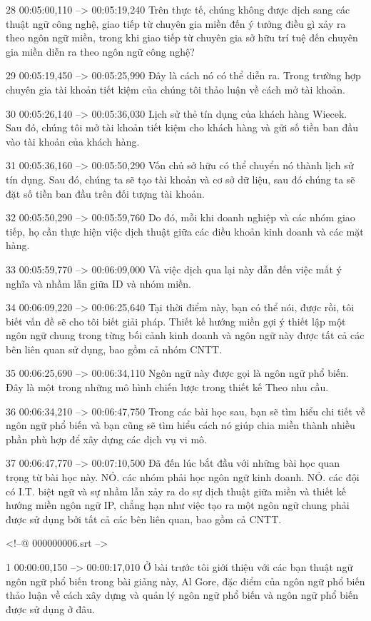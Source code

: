 28
00:05:00,110 --> 00:05:19,240
Trên thực tế, chúng không được dịch sang các thuật ngữ công nghệ, giao tiếp từ chuyên gia miền đến ý tưởng điều gì xảy ra theo ngôn ngữ miền, trong khi giao tiếp từ chuyên gia sở hữu trí tuệ đến chuyên gia miền diễn ra theo ngôn ngữ công nghệ?

29
00:05:19,450 --> 00:05:25,990
Đây là cách nó có thể diễn ra.  Trong trường hợp chuyên gia tài khoản tiết kiệm của chúng tôi thảo luận về cách mở tài khoản.

30
00:05:26,140 --> 00:05:36,030
Lịch sử thẻ tín dụng của khách hàng Wiecek.  Sau đó, chúng tôi mở tài khoản tiết kiệm cho khách hàng và gửi số tiền ban đầu vào tài khoản của khách hàng.

31
00:05:36,160 --> 00:05:50,290
Vốn chủ sở hữu có thể chuyển nó thành lịch sử tín dụng.  Sau đó, chúng ta sẽ tạo tài khoản và cơ sở dữ liệu, sau đó chúng ta sẽ đặt số tiền ban đầu trên đối tượng tài khoản.

32
00:05:50,290 --> 00:05:59,760
Do đó, mỗi khi doanh nghiệp và các nhóm giao tiếp, họ cần thực hiện việc dịch thuật giữa các điều khoản kinh doanh và các mặt hàng.

33
00:05:59,770 --> 00:06:09,000
Và việc dịch qua lại này dẫn đến việc mất ý nghĩa và nhầm lẫn giữa ID và nhóm miền.

34
00:06:09,220 --> 00:06:25,640
Tại thời điểm này, bạn có thể nói, được rồi, tôi biết vấn đề sẽ cho tôi biết giải pháp.  Thiết kế hướng miền gợi ý thiết lập một ngôn ngữ chung trong từng bối cảnh kinh doanh và ngôn ngữ này được tất cả các bên liên quan sử dụng, bao gồm cả nhóm CNTT.

35
00:06:25,690 --> 00:06:34,110
Ngôn ngữ này được gọi là ngôn ngữ phổ biến.  Đây là một trong những mô hình chiến lược trong thiết kế Theo nhu cầu.

36
00:06:34,210 --> 00:06:47,750
Trong các bài học sau, bạn sẽ tìm hiểu chi tiết về ngôn ngữ phổ biến và bạn cũng sẽ tìm hiểu cách nó giúp chia miền thành nhiều phần phù hợp để xây dựng các dịch vụ vi mô.

37
00:06:47,770 --> 00:07:10,500
Đã đến lúc bắt đầu với những bài học quan trọng từ bài học này.  NÓ.  các nhóm phải học ngôn ngữ kinh doanh.  NÓ.  các đội có I.T.  biệt ngữ và sự nhầm lẫn xảy ra do sự dịch thuật giữa miền và thiết kế hướng miền ngôn ngữ IP, chẳng hạn như việc tạo ra một ngôn ngữ chung phải được sử dụng bởi tất cả các bên liên quan, bao gồm cả CNTT.

<!--@ 000000006.srt -->

1
00:00:00,150 --> 00:00:17,010
Ở bài trước tôi giới thiệu với các bạn thuật ngữ ngôn ngữ phổ biến trong bài giảng này, Al Gore, đặc điểm của ngôn ngữ phổ biến thảo luận về cách xây dựng và quản lý ngôn ngữ phổ biến và ngôn ngữ phổ biến được sử dụng ở đâu.

